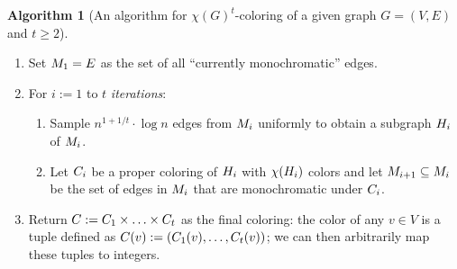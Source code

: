 \documentclass[11pt]{article}
\theoremstyle{definition}
\newenvironment{ourbox}{\begin{mdframed}[hidealllines=false,innerleftmargin=10pt,backgroundcolor=white!10,innertopmargin=5pt,innerbottommargin=5pt,roundcorner=10pt]}{\end{mdframed}}
\newtheorem{mdalgorithm}{Algorithm}
\newenvironment{Algorithm}{\begin{ourbox}\begin{mdalgorithm}}{\end{mdalgorithm}\end{ourbox}}
\renewcommand{\geq}{\geqslant}
\begin{document}
\begin{Algorithm}[An algorithm for $\chi(G)^t$-coloring of a given graph $G=(V,E)$ and $t \geq 2$]\label{alg:sparsification}
~\vspace{-4pt}
\begin{enumerate}
    \item Set $M_{1}= E$ as the set of all ``currently monochromatic'' edges. 
    \item For $i:=1$ to $t$ \emph{iterations}:
    \begin{enumerate}
        \item Sample $n^{1+{1/t}}\cdot\log n$ edges from $M_{i}$ uniformly to obtain a subgraph $H_{i}$ of $M_{i}$.
        \item Let $C_{i}$ be a proper coloring of $H_{i}$ with $\chi(H_{i})$ colors and let $M_{i+1} \subseteq M_{i}$ be the set of edges in $M_{i}$ that are monochromatic 
        under $C_{i}$. 
    \end{enumerate}
    \item Return $C := C_{1} \times \ldots \times C_{t}$ as the final coloring: the color of any $v \in V$ is a tuple defined as $C(v) := (C_{1}(v),\ldots,C_{t}(v))$; we can then arbitrarily map these
    tuples to integers. 
\end{enumerate}
\end{Algorithm}
\end{document}
